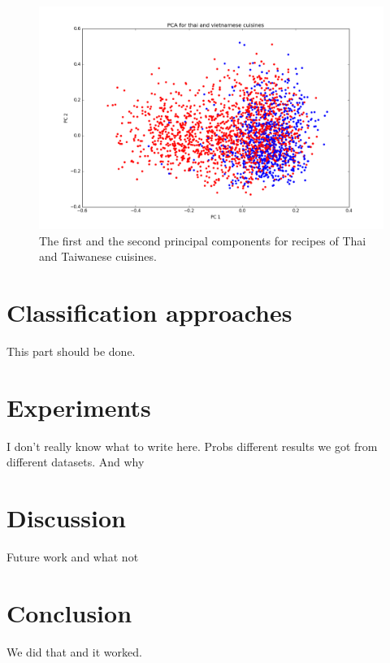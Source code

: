 \documentclass[prodmode,acmtap]{acmlarge}
\begin{document}
\begin{figure}[tp]
\centering
\includegraphics[scale=0.2]{PCA_thai_vietnam}
\caption{The first and the second principal components for recipes of Thai and Taiwanese cuisines.}
\label{thai_taiwan_pca12}
\end{figure}





\section{Classification approaches}
This part should be done. 

\section {Experiments}
I don't really know what to write here. Probs different results we got from different datasets. And why

\section{Discussion}
Future work and what not

\section{Conclusion}
We did that and it worked. 





\end{document}

